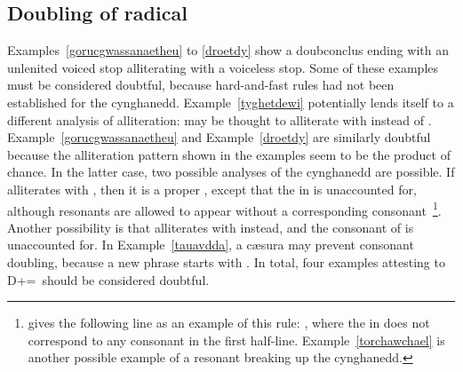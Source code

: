 \subsection{Doubling of radical \xD}
Examples~\ref{gorucgwassanaetheu} to \ref{droetdy} %
show a \gls{doubconclus} ending with an unlenited voiced stop alliterating with a voiceless stop.
Some of these examples must be considered doubtful, because hard-and-fast rules had not been established for the cynghanedd. Example~\ref{tyghetdewi} potentially lends itself to a different analysis of alliteration:  may be thought to alliterate with  instead of . Example~\ref{gorucgwassanaetheu} and Example~\ref{droetdy} are similarly doubtful because the alliteration pattern shown in the examples seem to be the product of chance. In the latter case, two possible analyses of the cynghanedd are possible. If  alliterates with , then it is a proper , except that the  in  is unaccounted for, although resonants are allowed to appear without a corresponding consonant~\autocite[203--07]{jones_meddwl_2005}\footnote{\Textcite[203--07]{jones_meddwl_2005} gives the following line as an example of this rule: , where the  in  does not correspond to any consonant in the first half-line. Example~\ref{torchawchael} is another possible example of a resonant breaking up the cynghanedd.}. Another possibility is that   alliterates with  instead, and the consonant of  is unaccounted for. In Example~\ref{tauavdda}, a cæsura may prevent consonant doubling, because a new phrase starts with . In total, four examples attesting to \gls{D}+\xD=\xT\ should be considered doubtful.\begin{mwl}

\end{mwl}
